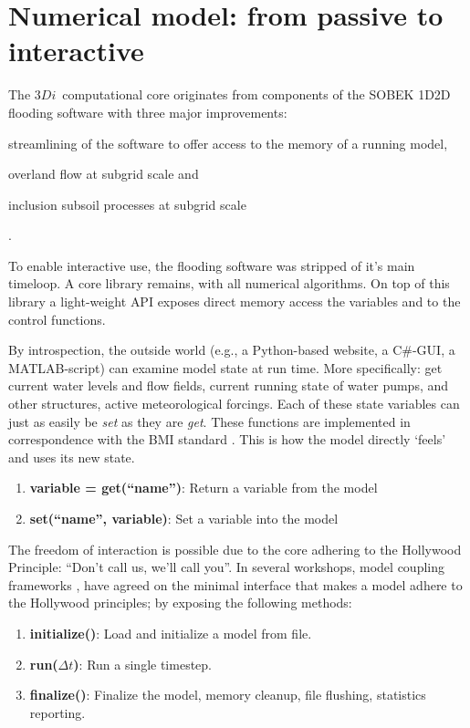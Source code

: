 \documentclass[a4paper]{article}
\DeclareRobustCommand{\threedi}{$3Di$~}
\begin{document}
\section{Numerical model: from passive to interactive}
The \threedi computational core originates from components of the {SOBEK} 1D2D flooding software \citep{Stelling2006} with three major improvements: \begin{inparaenum}
\item streamlining of the software to offer access to the memory of a running model,
\item overland flow at subgrid scale and
\item inclusion subsoil processes at subgrid scale
\end{inparaenum}.

To enable interactive use, the flooding software was stripped of it's main timeloop. A core library remains, with all numerical algorithms. On top of this library a light-weight \ac{API} exposes direct memory access the variables and to the control functions.

By introspection, the outside world (e.g., a Python-based website, a C\#-\ac{GUI}, a MATLAB-script) can examine model state at run time. More specifically: get current water levels and flow fields, current running state of water pumps, and other structures, active meteorological forcings. Each of these state variables can just as easily be \emph{set} as they are \emph{get}. These functions are implemented in correspondence with the \ac{BMI} standard \citep{Peckham2013}. This is how the model directly `feels' and uses its new state.

\begin{enumerate}
\item \textbf{variable = get(``name'')}: Return a variable from the model
\item \textbf{set(``name'', variable)}: Set a variable into the model
\end{enumerate}

The freedom of interaction is possible due to the core adhering to the Hollywood Principle: ``Don't call us, we'll call you''. In several workshops, model coupling frameworks \citep[see][for an overview]{Jagers2010}, have agreed on the minimal interface that makes a model adhere to the Hollywood principles; by exposing the following methods:

\begin{enumerate}
\item \textbf{initialize()}: Load and initialize a model from file.
\item \textbf{run($\Delta t$)}: Run a single timestep.
\item \textbf{finalize()}: Finalize the model, memory cleanup, file flushing, statistics reporting.
\end{enumerate}
\end{document}
